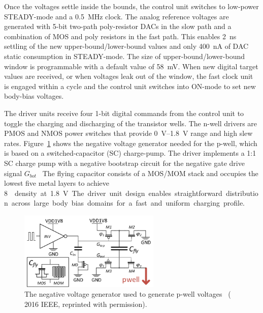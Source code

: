 \documentclass[graybox]{svmult}
\begin{document}
Once the voltages settle inside the bounds, the control unit switches to low-power STEADY-mode and a \SI{0.5}{\mega\hertz} clock.
The analog reference voltages are generated with 5-bit two-path poly-resistor DACs in the slow path and a combination of MOS and poly resistors in the fast path.
This enables \SI{2}{\nano\second} settling of the new upper-bound/lower-bound values and only \SI{400}{\nano\ampere} of DAC static consumption in STEADY-mode.
The size of upper-bound/lower-bound window is programmable with a default value of \SI{58}{\milli\volt}.
When new digital target values are received, or when voltages leak out of the window, the fast clock unit is engaged within a cycle and the control unit switches into ON-mode to set new body-bias voltages.

The driver units receive four 1-bit digital commands from the control unit to toggle the charging and discharging of the transistor wells.
The n-well drivers are PMOS and NMOS power switches that provide \SIrange[range-phrase = --]{0}{1.8}{\volt} range and high slew rates.
Figure~\ref{fig:bbgen-negative-vgen} shows the negative voltage generator needed for the p-well, which is based on a switched-capacitor (SC) charge-pump.
The driver implements a 1:1 SC charge pump with a negative bootstrap circuit for the negative gate drive signal $G_{bot}$~\cite{Tsukikawa1993}
The flying capacitor consists of a MOS/MOM stack and occupies the lowest five metal layers to achieve \SI{8}{\femto\farad\per\milli\meter\square} density at \SI{1.8}{\volt}.
The driver unit design enables straightforward distribution across large body bias domains for a fast and uniform charging profile.

\begin{figure}
  \centering
  \includegraphics[width=0.6\textwidth]{bbgen-negative-vgen}
  \caption{The negative voltage generator used to generate p-well voltages~\cite{Blagojevic2016} ({\textcopyright} 2016 IEEE, reprinted with permission).}
  \label{fig:bbgen-negative-vgen}
\end{figure}

\end{document}
